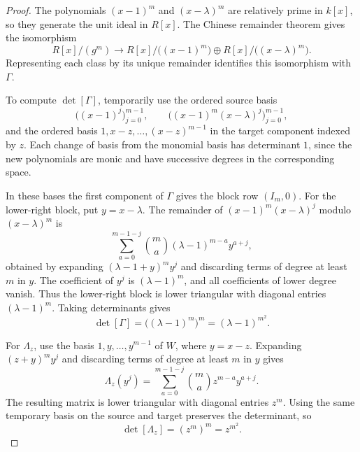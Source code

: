 \documentclass{amsart}
\numberwithin{equation}{section}
\begin{document}
\begin{proof}
The polynomials $(x-1)^m$ and $(x-\lambda)^m$ are
relatively prime in $k[x]$, so they generate the unit ideal
in $R[x]$. The Chinese remainder theorem gives the
isomorphism
\[
  R[x]/(g^m)
    \longrightarrow
    R[x]/\bigl((x-1)^m\bigr)
       \oplus R[x]/\bigl((x-\lambda)^m\bigr).
\]
Representing each class by its unique remainder identifies
this isomorphism with $\Gamma$.

To compute $\det[\Gamma]$, temporarily use the ordered
source basis
\[
  \bigl((x-1)^j\bigr)_{j=0}^{m-1},\qquad
  \bigl((x-1)^m(x-\lambda)^j\bigr)_{j=0}^{m-1},
\]
and the ordered basis $1,x-z,\ldots,(x-z)^{m-1}$ in
the target component indexed by $z$. Each change of
basis from the monomial basis has determinant $1$,
since the new polynomials are monic and have successive
degrees in the corresponding space.

In these bases the first component of $\Gamma$ gives
the block row $(I_m,0)$. For the lower-right block, put
$y=x-\lambda$. The remainder of
$(x-1)^m(x-\lambda)^j$ modulo $(x-\lambda)^m$ is
\[
  \sum_{a=0}^{m-1-j}
    \binom{m}{a}(\lambda-1)^{m-a}y^{a+j},
\]
obtained by expanding $(\lambda-1+y)^m y^j$ and
discarding terms of degree at least $m$ in $y$.
The coefficient of $y^j$ is $(\lambda-1)^m$,
and all coefficients of lower degree vanish. Thus the
lower-right block is lower triangular with diagonal
entries $(\lambda-1)^m$. Taking determinants gives
\[
  \det[\Gamma]=\bigl((\lambda-1)^m\bigr)^m
    =(\lambda-1)^{m^2}.
\]

For $\Lambda_z$, use the basis $1,y,\ldots,y^{m-1}$ of $W$,
where $y=x-z$. Expanding $(z+y)^m y^j$ and discarding
terms of degree at least $m$ in $y$ gives
\[
  \Lambda_z(y^j)
    =\sum_{a=0}^{m-1-j}\binom{m}{a}z^{m-a}y^{a+j}.
\]
The resulting matrix is lower triangular with diagonal
entries $z^m$. Using the same temporary basis on the
source and target preserves the determinant, so
\[
  \det[\Lambda_z]=(z^m)^m=z^{m^2}.
\]


\end{proof}
\end{document}
